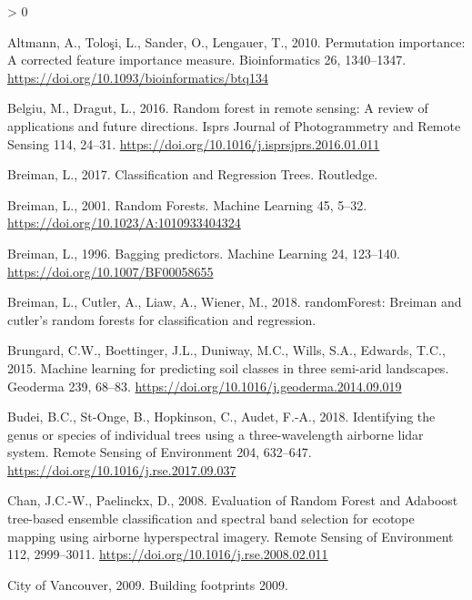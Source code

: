 \documentclass[
]{article}
\newlength{\cslhangindent}
\newenvironment{CSLReferences}[2] %
 {%
  \setlength{\parindent}{0pt}
  \ifodd #1 \everypar{\setlength{\hangindent}{\cslhangindent}}\ignorespaces\fi
  \ifnum #2 > 0
  \setlength{\parskip}{#2\baselineskip}
  \fi
 }%
 {}
\begin{document}
\hypertarget{refs}{}
\begin{CSLReferences}{1}{0}
\leavevmode\hypertarget{ref-altmann2010}{}%
Altmann, A., Toloşi, L., Sander, O., Lengauer, T., 2010. Permutation importance: A corrected feature importance measure. Bioinformatics 26, 1340--1347. \url{https://doi.org/10.1093/bioinformatics/btq134}

\leavevmode\hypertarget{ref-belgiu2016}{}%
Belgiu, M., Dragut, L., 2016. Random forest in remote sensing: A review of applications and future directions. Isprs Journal of Photogrammetry and Remote Sensing 114, 24--31. \url{https://doi.org/10.1016/j.isprsjprs.2016.01.011}

\leavevmode\hypertarget{ref-breiman2017}{}%
Breiman, L., 2017. Classification and Regression Trees. Routledge.

\leavevmode\hypertarget{ref-breiman2001}{}%
Breiman, L., 2001. Random Forests. Machine Learning 45, 5--32. \url{https://doi.org/10.1023/A:1010933404324}

\leavevmode\hypertarget{ref-breiman1996}{}%
Breiman, L., 1996. Bagging predictors. Machine Learning 24, 123--140. \url{https://doi.org/10.1007/BF00058655}

\leavevmode\hypertarget{ref-R-randomForest}{}%
Breiman, L., Cutler, A., Liaw, A., Wiener, M., 2018. randomForest: Breiman and cutler's random forests for classification and regression.

\leavevmode\hypertarget{ref-brungard2015}{}%
Brungard, C.W., Boettinger, J.L., Duniway, M.C., Wills, S.A., Edwards, T.C., 2015. Machine learning for predicting soil classes in three semi-arid landscapes. Geoderma 239, 68--83. \url{https://doi.org/10.1016/j.geoderma.2014.09.019}

\leavevmode\hypertarget{ref-budei2018a}{}%
Budei, B.C., St-Onge, B., Hopkinson, C., Audet, F.-A., 2018. Identifying the genus or species of individual trees using a three-wavelength airborne lidar system. Remote Sensing of Environment 204, 632--647. \url{https://doi.org/10.1016/j.rse.2017.09.037}

\leavevmode\hypertarget{ref-chan2008}{}%
Chan, J.C.-W., Paelinckx, D., 2008. Evaluation of Random Forest and Adaboost tree-based ensemble classification and spectral band selection for ecotope mapping using airborne hyperspectral imagery. Remote Sensing of Environment 112, 2999--3011. \url{https://doi.org/10.1016/j.rse.2008.02.011}

\leavevmode\hypertarget{ref-cityofvancouver2009}{}%
City of Vancouver, 2009. Building footprints 2009.


\end{CSLReferences}
\end{document}
